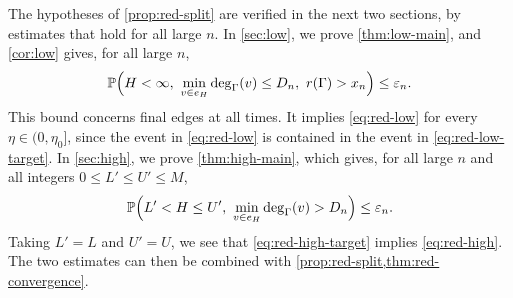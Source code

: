 The hypotheses of \cref{prop:red-split} are verified in the next two sections, by estimates that hold for all large $n$. In \cref{sec:low}, we prove \cref{thm:low-main}, and \cref{cor:low} gives, for all large $n$,
\begin{equation}\label{eq:red-low-target}
\Pp\Bigl(H < \infty, \ \min_{v \in e_H} \deg_\Gamma(v) \le D_n, \ r(\Gamma) > x_n\Bigr) \le \eps_n.
\end{equation}
This bound concerns final edges at all times. It implies \eqref{eq:red-low} for every $\eta \in (0, \eta_0]$, since the event in \eqref{eq:red-low} is contained in the event in \eqref{eq:red-low-target}. In \cref{sec:high}, we prove \cref{thm:high-main}, which gives, for all large $n$ and all integers $0 \le L' \le U' \le M$,
\begin{equation}\label{eq:red-high-target}
\mathbb P\Bigl(L' < H \le U', \ \min_{v \in e_H} \deg_\Gamma(v) > D_n\Bigr) \le \varepsilon_n.
\end{equation}
Taking $L' = L$ and $U' = U$, we see that \eqref{eq:red-high-target} implies \eqref{eq:red-high}. The two estimates can then be combined with \cref{prop:red-split,thm:red-convergence}.
